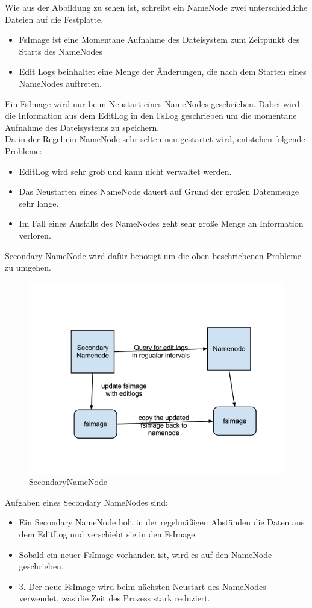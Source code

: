 Wie aus der Abbildung zu sehen ist, schreibt ein NameNode zwei unterschiedliche Dateien auf die Festplatte. \\
\begin{itemize}
\item FsImage ist eine Momentane Aufnahme des Dateisystem zum Zeitpunkt des Starts des NameNodes
\item Edit Logs beinhaltet eine Menge der Änderungen, die nach dem Starten eines NameNodes auftreten.
\end{itemize}
Ein FsImage wird nur beim Neustart eines NameNodes geschrieben. Dabei wird die Information aus dem EditLog in den FsLog geschrieben um die momentane Aufnahme des Dateisystems zu speichern.\\
Da in der Regel ein NameNode sehr selten neu gestartet wird, entstehen folgende Probleme:
\begin{itemize}
\item EditLog wird sehr groß und kann nicht verwaltet werden.
\item Das Neustarten eines NameNode dauert auf Grund der großen Datenmenge sehr lange.
\item Im Fall eines Ausfalls des NameNodes geht sehr große Menge an Information verloren.
\end{itemize}
Secondary NameNode wird dafür benötigt um die oben beschriebenen Probleme zu umgehen.\\
\begin{figure}
	\centering
	\includegraphics[width=1.0\textwidth]{images/secondarynamenode.png}
	\caption{SecondaryNameNode}
	\label{img:grafik-SecondaryNameNode}
\end{figure}
Aufgaben eines Secondary NameNodes sind:
\begin{itemize}
\item Ein Secondary NameNode holt in der regelmäßigen Abständen die Daten aus dem EditLog und verschiebt sie in den FsImage.
\item Sobald ein neuer FsImage vorhanden ist, wird es auf den NameNode geschrieben.
\item 3. Der neue FsImage wird beim nächsten Neustart des NameNodes verwendet, was die Zeit des Prozess stark reduziert.
\end{itemize}
\cite{secNameNode}
